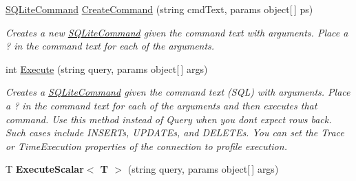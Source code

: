 \begin{DoxyCompactItemize}
\item 
\hyperlink{classSQLite_1_1SQLiteCommand}{S\+Q\+Lite\+Command} \hyperlink{classSQLite_1_1SQLiteConnection_a112ac999fccd302bda742992f044f3ee}{Create\+Command} (string cmd\+Text, params object\mbox{[}$\,$\mbox{]} ps)
\begin{DoxyCompactList}\small\item\em Creates a new \hyperlink{classSQLite_1_1SQLiteCommand}{S\+Q\+Lite\+Command} given the command text with arguments. Place a \textquotesingle{}?\textquotesingle{} in the command text for each of the arguments. \end{DoxyCompactList}\item 
int \hyperlink{classSQLite_1_1SQLiteConnection_a5fbb3e385d21cfbee95e4a2a71a3043b}{Execute} (string query, params object\mbox{[}$\,$\mbox{]} args)
\begin{DoxyCompactList}\small\item\em Creates a \hyperlink{classSQLite_1_1SQLiteCommand}{S\+Q\+Lite\+Command} given the command text (S\+Q\+L) with arguments. Place a \textquotesingle{}?\textquotesingle{} in the command text for each of the arguments and then executes that command. Use this method instead of Query when you don\textquotesingle{}t expect rows back. Such cases include I\+N\+S\+E\+R\+Ts, U\+P\+D\+A\+T\+Es, and D\+E\+L\+E\+T\+Es. You can set the Trace or Time\+Execution properties of the connection to profile execution. \end{DoxyCompactList}\item 
\hypertarget{classSQLite_1_1SQLiteConnection_af88acbe7da213c81875c3a35a5d61337}{}T {\bfseries Execute\+Scalar$<$ T $>$} (string query, params object\mbox{[}$\,$\mbox{]} args)\label{classSQLite_1_1SQLiteConnection_af88acbe7da213c81875c3a35a5d61337}


\end{DoxyCompactItemize}

